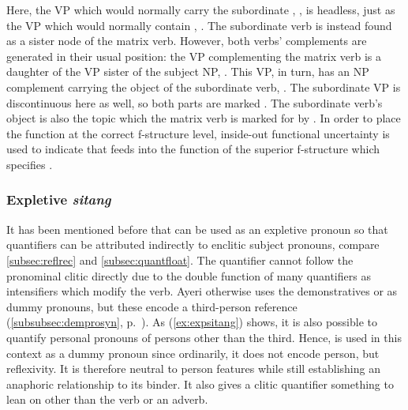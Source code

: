 Here, the VP which would normally carry the subordinate , , is
headless, just as the VP which would normally contain ,
. The subordinate verb is instead found
as a sister node of the matrix verb. However, both verbs' complements are
generated in their usual position: the VP complementing the matrix verb is a
daughter of the VP sister of the subject NP, . This
VP, in turn, has an NP complement carrying the object of the subordinate verb,
. The subordinate VP is discontinuous here as well, so
both parts are marked \XCompl{}. The subordinate verb's object is also the
topic which the matrix verb is marked for by . In order to place
the \Top{} function at the correct f-structure level, inside-out functional
uncertainty is used to indicate that  feeds into the \Top{}
function of the superior f-structure which specifies \XCompl{}.


\subsubsection{Expletive \emph{sitang}}
\label{subsec:expsitang}

It has been mentioned before that  can be used
as an expletive pronoun so that quantifiers can be attributed indirectly to
enclitic subject pronouns, compare 
\autoref{subsec:reflrec} and \autoref{subsec:quantfloat}. The quantifier cannot
follow the pronominal clitic directly due to the double function of many
quantifiers as intensifiers which modify the verb. Ayeri otherwise uses the
demonstratives  or 
as dummy pronouns, but these encode a third-person reference
(\autoref{subsubsec:demprosyn}, p.~\pageref{subsubsec:demprosyn}). As 
(\ref{ex:expsitang}) shows, it is also possible to quantify personal
pronouns of persons other than the third. Hence,  is used in
this context as a dummy pronoun since ordinarily, it does not encode person,
but reflexivity. It is therefore neutral to person features while still
establishing an anaphoric relationship to its binder. It also gives a clitic quantifier
something to lean on other than the verb or an adverb.

